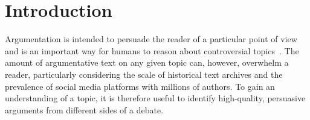 \section{Introduction}\label{sec:intro}



Argumentation is intended to persuade the reader of a particular point of view and 
is an important way for humans to reason about controversial topics~\cite{mercier2011humans}. 
The amount of argumentative text on any given topic can, however, overwhelm a reader, particularly
considering the scale of historical text archives 
and the prevalence of social media platforms with millions of authors.
To gain an understanding of a topic, it is therefore useful to identify high-quality, 
persuasive arguments from different sides of a debate.


